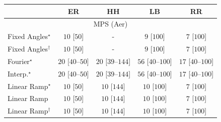 \begin{tabular}{l|cccc|}
\toprule
            & ER & HH & LB & RR \\
\midrule
\multicolumn{5}{c}{\rule{0pt}{8pt}MPS (Aer)} \\
\midrule
Fixed Angles$^\star$ & {\cellcolor[HTML]{F7FCF5}} \color[HTML]{000000} $10$ [$50$] & {\cellcolor[HTML]{000000}} \color[HTML]{F1F1F1} {\cellcolor{white}} \color{black} - & {\cellcolor[HTML]{F7FCF5}} \color[HTML]{000000} $9$ [$100$] & {\cellcolor[HTML]{F7FCF5}} \color[HTML]{000000} $7$ [$100$] \\
Fixed Angles$^\dagger$ & {\cellcolor[HTML]{F7FCF5}} \color[HTML]{000000} $10$ [$50$] & {\cellcolor[HTML]{000000}} \color[HTML]{F1F1F1} {\cellcolor{white}} \color{black} - & {\cellcolor[HTML]{F7FCF5}} \color[HTML]{000000} $9$ [$100$] & {\cellcolor[HTML]{F7FCF5}} \color[HTML]{000000} $7$ [$100$] \\
Fourier$^\star$ & {\cellcolor[HTML]{F5FBF2}} \color[HTML]{000000} $20$ [$40$--$50$] & {\cellcolor[HTML]{F5FBF2}} \color[HTML]{000000} $20$ [$39$--$144$] & {\cellcolor[HTML]{EFF9EB}} \color[HTML]{000000} $56$ [$40$--$100$] & {\cellcolor[HTML]{F5FBF3}} \color[HTML]{000000} $17$ [$40$--$100$] \\
Interp.$^\star$ & {\cellcolor[HTML]{F5FBF2}} \color[HTML]{000000} $20$ [$40$--$50$] & {\cellcolor[HTML]{F5FBF2}} \color[HTML]{000000} $20$ [$39$--$144$] & {\cellcolor[HTML]{EFF9EB}} \color[HTML]{000000} $56$ [$40$--$100$] & {\cellcolor[HTML]{F5FBF3}} \color[HTML]{000000} $17$ [$40$--$100$] \\
Linear Ramp$^\star$ & {\cellcolor[HTML]{F7FCF5}} \color[HTML]{000000} $10$ [$50$] & {\cellcolor[HTML]{F7FCF5}} \color[HTML]{000000} $10$ [$144$] & {\cellcolor[HTML]{F7FCF5}} \color[HTML]{000000} $10$ [$100$] & {\cellcolor[HTML]{F7FCF5}} \color[HTML]{000000} $7$ [$100$] \\
Linear Ramp & {\cellcolor[HTML]{F7FCF5}} \color[HTML]{000000} $10$ [$50$] & {\cellcolor[HTML]{F7FCF5}} \color[HTML]{000000} $10$ [$144$] & {\cellcolor[HTML]{F7FCF5}} \color[HTML]{000000} $10$ [$100$] & {\cellcolor[HTML]{F7FCF5}} \color[HTML]{000000} $7$ [$100$] \\
Linear Ramp$^\dagger$ & {\cellcolor[HTML]{F7FCF5}} \color[HTML]{000000} $10$ [$50$] & {\cellcolor[HTML]{F7FCF5}} \color[HTML]{000000} $10$ [$144$] & {\cellcolor[HTML]{F7FCF5}} \color[HTML]{000000} $10$ [$100$] & {\cellcolor[HTML]{F7FCF5}} \color[HTML]{000000} $7$ [$100$] \\

\end{tabular}
